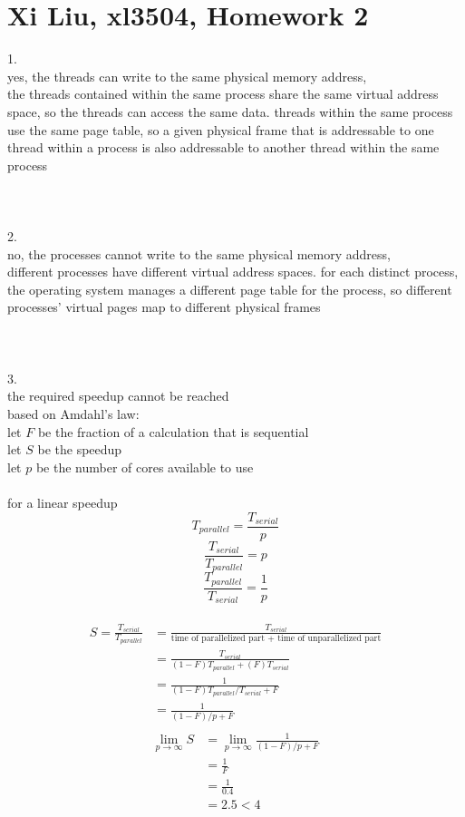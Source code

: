 \documentclass[12pt,border=4pt,multi]{article}%
\begin{document}
\section*{Xi Liu, xl3504, Homework 2}
1.\\
yes, the threads can write to the same physical memory address,\\
the threads contained within the same process share the same virtual address space, so the threads can access the same data. threads within the same process use the same page table, so a given physical frame that is addressable to one thread within a process is also addressable to another thread within the same process\\
\\
\\
\\
2.\\
no, the processes cannot write to the same physical memory address,\\
different processes have different virtual address spaces. for each distinct process, the operating system manages a different page table for the process, so different processes' virtual pages map to different physical frames\\
\\
\\
\\
3.\\
the required speedup cannot be reached\\
based on Amdahl's law:\\
let $F$ be the fraction of a calculation that is sequential\\
let $S$ be the speedup\\
let $p$ be the number of cores available to use\\
\\
for a linear speedup
{\large
\[T_{parallel} = \frac{T_{serial}}{p}\]
\[\frac{T_{serial}}{T_{parallel}} = p\]
\[\frac{T_{parallel}}{T_{serial}} = \frac{1}{p}\]
\\
\begin{align*}
S = \frac{T_{serial}}{T_{parallel}} &= \frac{T_{serial}}{\text{time of parallelized part + time of unparallelized part}}\\
&= \frac{T_{serial}}{(1 - F)T_{parallel} + (F)T_{serial}}\\
&= \frac{1}{(1 - F)T_{parallel}/T_{serial} + F}\\
&= \frac{1}{(1 - F)/p + F}\\
\end{align*}
\begin{align*}
\lim_{p \rightarrow \infty} S &= \lim_{p \rightarrow \infty} \frac{1}{(1 - F)/p + F}\\
&= \frac{1}{F}\\
&= \frac{1}{0.4}\\
&= 2.5 < 4\\
\end{align*}
}
\end{document}
